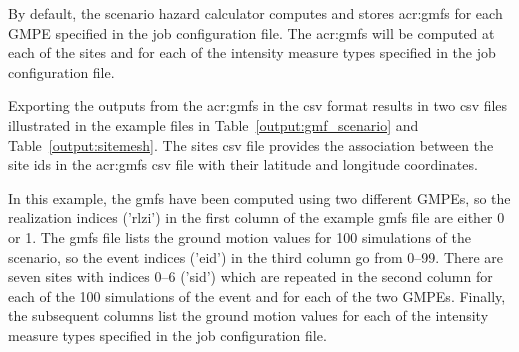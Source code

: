 By default, the scenario hazard calculator computes and stores
\glspl{acr:gmf} for each GMPE specified in the job configuration file. The
\glspl{acr:gmf} will be computed at each of the sites and for each of the
intensity measure types specified in the job configuration file.

Exporting the outputs from the \glspl{acr:gmf} in the csv format results in
two csv files illustrated in the example files in
Table~\ref{output:gmf_scenario} and Table~\ref{output:sitemesh}. The sites csv
file provides the association between the site ids in the \glspl{acr:gmf} csv
file with their latitude and longitude coordinates.



In this example, the gmfs have been computed using two different GMPEs, so the
realization indices ('rlzi') in the first column of the example gmfs file are
either 0 or 1. The gmfs file lists the ground motion values for 100
simulations of the scenario, so the event indices ('eid') in the third column
go from 0–99. There are seven sites with indices 0–6 ('sid') which are
repeated in the second column for each of the 100 simulations of the event and
for each of the two GMPEs. Finally, the subsequent columns list the ground
motion values for each of the intensity measure types specified in the job
configuration file.


